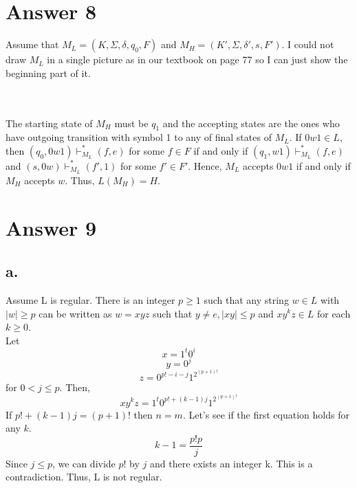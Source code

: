 \documentclass[12pt]{article}
\begin{document}
\section*{Answer 8}
Assume that $M_L=(K, \Sigma, \delta, q_0, F)$ and $M_H=(K', \Sigma, \delta ', s, F')$. I could not draw $M_L$ in a single picture as in our textbook on page 77 so I can just show the beginning part of it. \\

 \\\\
 The starting state of $M_H$ must be $q_1$ and the accepting states are the ones who have outgoing transition with symbol 1 to any of final states of $M_L$. If $0w1 \in L$, then $(q_0,0w1)\vdash_{M_L}^*(f,e)$ for some $f\in F$ if and only if $(q_1,w1)\vdash_{M_L}^*(f,e)$ and $(s,0w)\vdash_{M_L}^*(f',1)$ for some $f'\in F'$. Hence, $M_L$ accepts $0w1$ if and only if $M_H$ accepts $w$. Thus, $L(M_H)=H$.
 

\section*{Answer 9}

\subsection*{a.}
Assume L is regular. There is an integer $p \geq 1$ such that any string $w\in L$ with $|w|\geq p$ can be written as $w=xyz$ such that $y\neq e,|xy|\leq p$ and $xy^kz\in L$ for each $k\geq 0$.\\
Let
$$x=1^t0^i$$
$$y=0^j$$
$$z=0^{p!-i-j}1^{2^{(p+1)!}}$$
for $0<j\leq p$. Then,
$$xy^kz=1^t0^{p!+(k-1)j}1^{2^{(p+1)!}}$$
If $p!+(k-1)j=(p+1)!$ then $n=m$. Let's see if the first equation holds for any $k$.
$$k-1=\frac{p!p}{j}$$
Since $j\leq p$, we can divide $p!$ by $j$ and there exists an integer k. This is a contradiction. Thus, L is not regular. 
\end{document}
